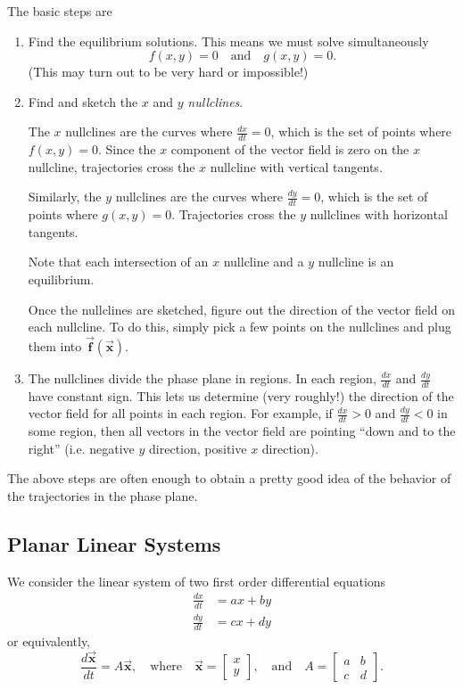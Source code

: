 \documentclass{book}
\newcommand{\BF}{\vec{\textbf{f}}}
\newcommand{\BX}{\vec{\textbf{x}}}
\begin{document}
The basic steps are
\begin{enumerate}
\item Find the equilibrium solutions.
This means we must solve simultaneously
\begin{equation}
    f(x,y) = 0 \quad \textrm{and} \quad g(x,y) =0.
\end{equation}
(This may turn out to be very hard or impossible!)
\item Find and sketch the $x$ and $y$ \emph{nullclines}.

The $x$ nullclines are the curves where $\frac{dx}{dt}=0$, which
is the set of points where $f(x,y)=0$.
Since the $x$ component of the vector field is zero on the
$x$ nullcline, trajectories cross the $x$ nullcline with
vertical tangents.

Similarly, the $y$ nullclines are the curves where
$\frac{dy}{dt} = 0$, which is the set of points where $g(x,y) = 0$.
Trajectories cross the $y$ nullclines with horizontal tangents.

Note that each intersection of an $x$ nullcline and a $y$ nullcline
is an equilibrium.

Once the nullclines are sketched, figure out the direction of the
vector field on each nullcline. To do this, simply pick a few points
on the nullclines and plug them into $\BF(\BX)$.

\item
The nullclines divide the phase plane in regions.  In each
region, $\frac{dx}{dt}$ and $\frac{dy}{dt}$ have constant sign.
This lets us determine (very roughly!) the direction of the
vector field for all points in each region.  For example,
if $\frac{dx}{dt} > 0$ and $\frac{dy}{dt} < 0$ in some region,
then all vectors in the vector field are pointing
``down and to the right'' (i.e. negative $y$ direction,
positive $x$ direction).
\end{enumerate}
The above steps are often enough to obtain a
pretty good idea of the behavior of the trajectories
in the phase plane.


\subsection{Planar Linear Systems}


We consider the linear system of two first order
differential equations
\begin{equation}
\begin{split}
  \frac{dx}{dt} & = ax + by \\
  \frac{dy}{dt} & = cx + dy
\end{split}
\end{equation}
or equivalently,
\begin{equation}
  \frac{d\BX}{dt} = A\BX, \quad \textrm{where} \quad
     \BX = \begin{bmatrix} x \\ y \end{bmatrix},
     \quad \textrm{and} \quad
     A = \begin{bmatrix} a & b \\ c & d \end{bmatrix}.
\label{eqn:linearsys}
\end{equation}
\end{document}
